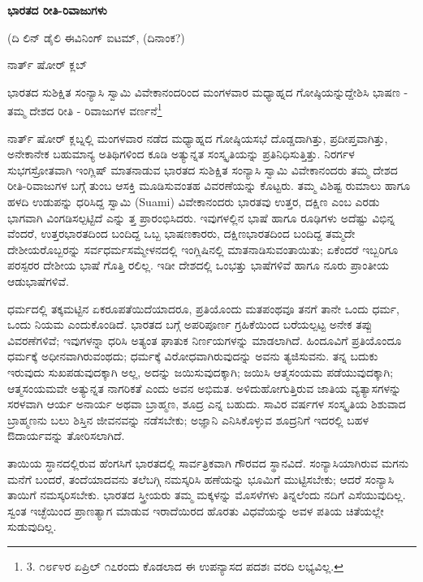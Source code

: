 \begin{center}
\textbf{ಭಾರತದ ರೀತಿ-ರಿವಾಜುಗಳು}
\end{center}

\begin{center}
(ದಿ ಲಿನ್ ಡೈಲಿ ಈವಿನಿಂಗ್ ಐಟಮ್​, (ದಿನಾಂಕ?)
\end{center}

\begin{center}
ನಾರ್ತ್ ಷೋರ್ ಕ್ಲಬ್
\end{center}

ಭಾರತದ ಸುಶಿಕ್ಷಿತ ಸಂನ್ಯಾಸಿ ಸ್ವಾಮಿ ವಿವೇಕಾನಂದರಿಂದ ಮಂಗಳವಾರ ಮಧ್ಯಾಹ್ನದ ಗೋಷ್ಠಿಯನ್ನುದ್ದೇಶಿಸಿ ಭಾಷಣ - ತಮ್ಮ ದೇಶದ ರೀತಿ - ರಿವಾಜುಗಳ ವರ್ಣನೆ\footnote{3. ೧೮೯೪ರ ಏಪ್ರಿಲ್ ೧೭ರಂದು ಕೊಡಲಾದ ಈ ಉಪನ್ಯಾಸದ ಪದಶಃ ವರದಿ ಲಭ್ಯವಿಲ್ಲ.}

ನಾರ್ತ್ ಷೋರ್ ಕ್ಲಬ್ನಲ್ಲಿ ಮಂಗಳವಾರ ನಡೆದ ಮಧ್ಯಾಹ್ನದ ಗೋಷ್ಠಿಯಸಭೆ ದೊಡ್ಡದಾಗಿತ್ತು, ಪ್ರದೀಪ್ತವಾಗಿತ್ತು, ಅನೇಕಾನೇಕ ಬಹುಮಾನ್ಯ ಅತಿಥಿಗಳಿಂದ ಕೂಡಿ ಅತ್ಯುನ್ನತ ಸಂಸ್ಕೃತಿಯನ್ನು ಪ್ರತಿನಿಧಿಸುತ್ತಿತ್ತು. ನಿರರ್ಗಳ ಸುಭಗಸ್ರೋತವಾಗಿ ಇಂಗ್ಲಿಷ್ ಮಾತನಾಡುವ ಭಾರತದ ಸುಶಿಕ್ಷಿತ ಸಂನ್ಯಾಸಿ ಸ್ವಾಮಿ ವಿವೇಕಾನಂದರು ತಮ್ಮ ದೇಶದ ರೀತಿ-ರಿವಾಜುಗಳ ಬಗ್ಗೆ ತುಂಬ ಆಸಕ್ತಿ ಮೂಡಿಸುವಂತಹ ವಿವರಣೆಯನ್ನು ಕೊಟ್ಟರು. ತಮ್ಮ ವಿಶಿಷ್ಟ ರುಮಾಲು ಹಾಗೂ ಹಳದಿ ಉಡುಪನ್ನು ಧರಿಸಿದ್ದ ಸ್ವಾಮಿ (Suami) ವಿವೇಕಾನಂದರು ಭಾರತವು ಉತ್ತರ, ದಕ್ಷಿಣ ಎಂಬ ಎರಡು ಭಾಗವಾಗಿ ವಿಂಗಡಿಸಲ್ಪಟ್ಟಿದೆ ಎನ್ನು ತ್ತ ಪ್ರಾರಂಭಿಸಿದರು. ಇವುಗಳಲ್ಲಿನ ಭಾಷೆ ಹಾಗೂ ರೂಢಿಗಳು ಅದೆಷ್ಟು ವಿಭಿನ್ನ ವೆಂದರೆ, ಉತ್ತರಭಾರತದಿಂದ ಬಂದಿದ್ದ ಒಬ್ಬ ಭಾಷಣಕಾರರು, ದಕ್ಷಿಣಭಾರತದಿಂದ ಬಂದಿದ್ದ ತಮ್ಮದೇ ದೇಶೀಯರೊಬ್ಬರನ್ನು ಸರ್ವಧರ್ಮಸಮ್ಮೇಳನದಲ್ಲಿ ಇಂಗ್ಲಿಷಿನಲ್ಲಿ ಮಾತನಾಡಿಸುವಂತಾಯಿತು; ಏಕೆಂದರೆ ಇಬ್ಬರಿಗೂ ಪರಸ್ಪರರ ದೇಶೀಯ ಭಾಷೆ ಗೊತ್ತಿ ರಲಿಲ್ಲ. ಇಡೀ ದೇಶದಲ್ಲಿ ಒಂಭತ್ತು ಭಾಷೆಗಳಿವೆ ಹಾಗೂ ನೂರು ಪ್ರಾಂತೀಯ ಆಡುಭಾಷೆಗಳಿವೆ.

ಧರ್ಮದಲ್ಲಿ ತಕ್ಕಮಟ್ಟಿನ ಏಕರೂಪತೆಯಿದೆಯಾದರೂ, ಪ್ರತಿಯೊಂದು ಮತಪಂಥವೂ ತನಗೆ ತಾನೇ ಒಂದು ಧರ್ಮ, ಒಂದು ನಿಯಮ ಎಂದುಕೊಂಡಿದೆ. ಭಾರತದ ಬಗ್ಗೆ ಅಪರಿಪೂರ್ಣ ಗ್ರಹಿಕೆಯಿಂದ ಬರೆಯಲ್ಪಟ್ಟ ಅನೇಕ ತಪ್ಪು ವಿವರಣೆಗಳಿವೆ; ಇವುಗಳನ್ನಾ ಧರಿಸಿ ಅತ್ಯಂತ ಘಾತುಕ ನಿರ್ಣಯಗಳನ್ನು ಮಾಡಲಾಗಿದೆ. ಹಿಂದೂವಿಗೆ ಪ್ರತಿಯೊಂದೂ ಧರ್ಮಕ್ಕೆ ಅಧೀನವಾಗಿರುವಂಥದು; ಧರ್ಮಕ್ಕೆ ವಿರೋಧವಾಗಿರುವುದನ್ನು ಅವನು ತ್ಯಜಿಸುವನು. ತನ್ನ ಬದುಕು ಇರುವುದು ಸುಖಪಡುವುದಕ್ಕಾಗಿ ಅಲ್ಲ, ಅದನ್ನು ಜಯಿಸುವುದಕ್ಕಾಗಿ; ಜಯಿಸಿ ಆತ್ಮಸಂಯಮ ಪಡೆಯುವುದಕ್ಕಾಗಿ; ಆತ್ಮಸಂಯಮವೇ ಅತ್ಯುನ್ನತ ನಾಗರಿಕತೆ ಎಂದು ಅವನ ಅಭಿಮತ. ಅಳಿದುಹೋಗುತ್ತಿರುವ ಜಾತಿಯ ವ್ಯತ್ಯಾಸಗಳನ್ನು ಸರಳವಾಗಿ ಆರ್ಯ ಅನಾರ್ಯ ಅಥವಾ ಬ್ರಾಹ್ಮಣ, ಶೂದ್ರ ಎನ್ನ ಬಹುದು. ಸಾವಿರ ವರ್ಷಗಳ ಸಂಸ್ಕೃತಿಯ ಶಿಶುವಾದ ಬ್ರಾಹ್ಮಣನು ಬಲು ಶಿಸ್ತಿನ ಜೀವನವನ್ನು ನಡೆಸಬೇಕು; ಅಜ್ಞಾನಿ ಎನಿಸಿಕೊಳ್ಳುವ ಶೂದ್ರನಿಗೆ ಇದರಲ್ಲಿ ಬಹಳ ಔದಾರ್ಯವನ್ನು ತೋರಿಸಲಾಗಿದೆ.

ತಾಯಿಯ ಸ್ಧಾನದಲ್ಲಿರುವ ಹೆಂಗಸಿಗೆ ಭಾರತದಲ್ಲಿ ಸಾರ್ವತ್ರಿಕವಾಗಿ ಗೌರವದ ಸ್ಥಾನವಿದೆ. ಸಂನ್ಯಾಸಿಯಾಗಿರುವ ಮಗನು ಮನೆಗೆ ಬಂದರೆ, ತಂದೆಯಾದವನು ತಲೆಬಗ್ಗಿ ನಮಸ್ಕರಿಸಿ ಹಣೆಯನ್ನು ಭೂಮಿಗೆ ಮುಟ್ಟಿಸಬೇಕು; ಆದರೆ ಸಂನ್ಯಾಸಿ ತಾಯಿಗೆ ನಮಸ್ಕರಿಸಬೇಕು. ಭಾರತದ ಸ್ತ್ರೀಯರು ತಮ್ಮ ಮಕ್ಕಳನ್ನು ಮೊಸಳೆಗಳು ತಿನ್ನಲೆಂದು ನದಿಗೆ ಎಸೆಯುವುದಿಲ್ಲ. ಸ್ವಂತ ಇಚ್ಛೆಯಿಂದ ಪ್ರಾಣತ್ಯಾಗ ಮಾಡುವ ಇರಾದೆಯಿರದ ಹೊರತು ವಿಧವೆಯನ್ನು ಅವಳ ಪತಿಯ ಚಿತೆಯಲ್ಲೇ ಸುಡುವುದಿಲ್ಲ.

